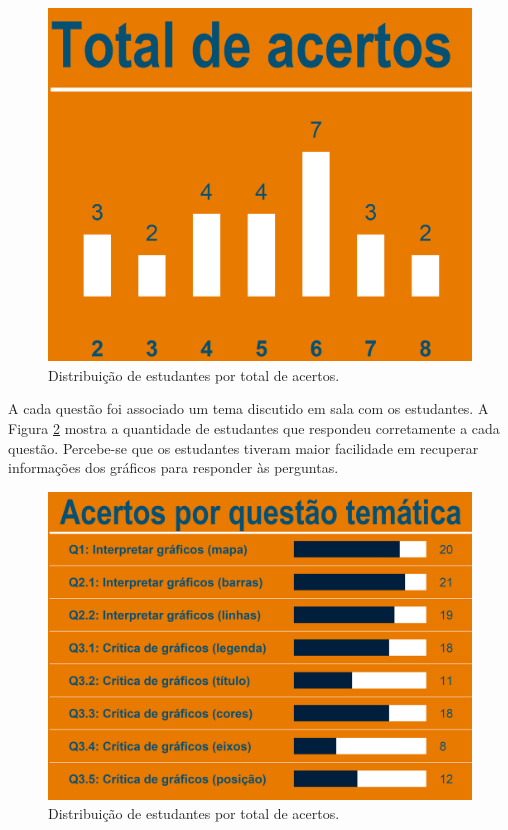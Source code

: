 \documentclass[
]{book}
\begin{document}
\begin{figure}

{\centering \includegraphics[width=0.75\linewidth,height=0.75\textheight]{images/Impactos/27} 

}

\caption{Distribuição de estudantes por total de acertos.}\label{fig:impacto27}
\end{figure}

A cada questão foi associado um tema discutido em sala com os estudantes. A Figura \ref{fig:impacto28} mostra a quantidade de estudantes que respondeu corretamente a cada questão. Percebe-se que os estudantes tiveram maior facilidade em recuperar informações dos gráficos para responder às perguntas.

\begin{figure}

{\centering \includegraphics[width=0.75\linewidth,height=0.75\textheight]{images/Impactos/28} 

}

\caption{Distribuição de estudantes por total de acertos.}\label{fig:impacto28}
\end{figure}
\end{document}
